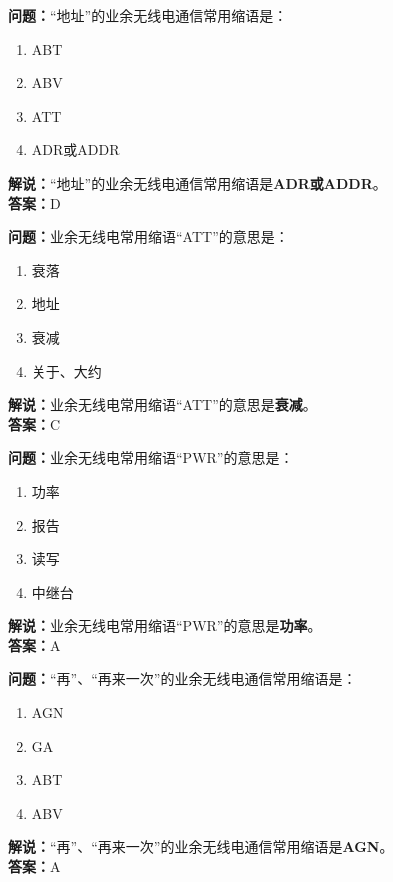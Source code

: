 \bigskip


\noindent\textbf{问题：}“地址”的业余无线电通信常用缩语是：
\begin{enumerate}[label=\Alph*), leftmargin=3em]
\item ABT
\item ABV
\item ATT
\item ADR或ADDR
\end{enumerate}
\noindent\textbf{解说：}“地址”的业余无线电通信常用缩语是\textbf{ADR或ADDR}。\\\noindent\textbf{答案：}D




\bigskip


\noindent\textbf{问题：}业余无线电常用缩语“ATT”的意思是：
\begin{enumerate}[label=\Alph*), leftmargin=3em]
\item 衰落
\item 地址
\item 衰减
\item 关于、大约
\end{enumerate}
\noindent\textbf{解说：}业余无线电常用缩语“ATT”的意思是\textbf{衰减}。\\\noindent\textbf{答案：}C



\bigskip


\noindent\textbf{问题：}业余无线电常用缩语“PWR”的意思是：
\begin{enumerate}[label=\Alph*), leftmargin=3em]
\item 功率
\item 报告
\item 读写
\item 中继台
\end{enumerate}
\noindent\textbf{解说：}业余无线电常用缩语“PWR”的意思是\textbf{功率}。\\\noindent\textbf{答案：}A



\bigskip


\noindent\textbf{问题：}“再”、“再来一次”的业余无线电通信常用缩语是：
\begin{enumerate}[label=\Alph*), leftmargin=3em]
\item AGN
\item GA
\item ABT
\item ABV
\end{enumerate}
\noindent\textbf{解说：}“再”、“再来一次”的业余无线电通信常用缩语是\textbf{AGN}。\\\noindent\textbf{答案：}A



